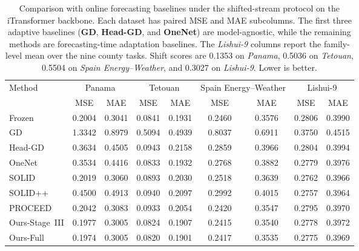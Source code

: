 ﻿\documentclass[journal]{IEEEtran}
\newenvironment{auditproblemblock}{\begingroup\color{red}}{\endgroup}
\begin{document}
\begin{auditproblemblock}
\begin{table}[t]
\caption{Comparison with online forecasting baselines under the shifted-stream protocol on the iTransformer backbone. Each dataset has paired MSE and MAE subcolumns. The first three adaptive baselines (\textbf{GD}, \textbf{Head-GD}, and \textbf{OneNet}) are model-agnostic, while the remaining methods are forecasting-time adaptation baselines. The \textit{Lishui-9} columns report the family-level mean over the nine county tasks. Shift scores are 0.1353 on \textit{Panama}, 0.5036 on \textit{Tetouan}, 0.5504 on \textit{Spain Energy--Weather}, and 0.3027 on \textit{Lishui-9}. Lower is better.}
\label{tab:shifted_online_sota}
\centering
\footnotesize
\setlength{\tabcolsep}{3.5pt}
\begin{tabular}{lcccccccc}
\toprule
Method & \multicolumn{2}{c}{Panama} & \multicolumn{2}{c}{Tetouan} & \multicolumn{2}{c}{Spain Energy--Weather} & \multicolumn{2}{c}{Lishui-9} \\
\cmidrule(lr){2-3}\cmidrule(lr){4-5}\cmidrule(lr){6-7}\cmidrule(lr){8-9}
 & MSE & MAE & MSE & MAE & MSE & MAE & MSE & MAE \\
\midrule
Frozen & 0.2004 & 0.3041 & 0.0841 & 0.1931 & 0.2460 & 0.3576 & 0.2806 & 0.3990 \\
GD & 1.3342 & 0.8979 & 0.5094 & 0.4939 & 0.8037 & 0.6911 & 0.3750 & 0.4515 \\
Head-GD & 0.3634 & 0.4505 & 0.0943 & 0.2158 & 0.2859 & 0.3966 & 0.2804 & 0.3994 \\
OneNet & 0.3534 & 0.4416 & 0.0833 & 0.1932 & 0.2768 & 0.3882 & 0.2779 & 0.3976 \\
SOLID & 0.2019 & 0.3060 & 0.0893 & 0.2030 & 0.2518 & 0.3639 & 0.2762 & 0.3966 \\
SOLID++ & 0.4500 & 0.4913 & 0.0940 & 0.2097 & 0.2992 & 0.4015 & 0.2757 & 0.3964 \\
PROCEED & 0.2042 & 0.3083 & 0.0933 & 0.2054 & 0.2420 & 0.3547 & 0.2795 & 0.3970 \\
Ours-Stage~III & 0.1977 & 0.3005 & 0.0824 & 0.1907 & 0.2415 & 0.3540 & 0.2778 & 0.3972 \\
Ours-Full & 0.1974 & 0.3005 & 0.0820 & 0.1901 & 0.2417 & 0.3535 & 0.2775 & 0.3969 \\
\bottomrule
\end{tabular}
\end{table}
\end{auditproblemblock}
\end{document}
